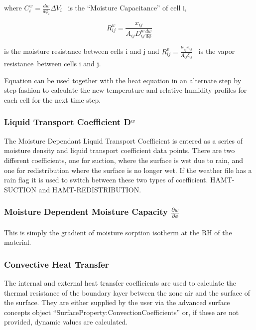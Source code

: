where \(C_i^w = \frac{dw}{d\phi_{i}}\Delta {V_i}\) ~is the ``Moisture Capacitance'' of cell i,

\begin{equation}
R_{ij}^w = \frac{{{x_{ij}}}}{{{A_{ij}}D_{ij}^w\frac{{dw}}{{d\phi }}}}
\end{equation}

is the moisture resistance between cells i and j and \(R_{ij}^v = \frac{\mu_{ij}x_{ij}}{A_{ij}\delta_{ij}}\) ~is the vapor resistance~between cells i and j.

Equation can be used together with the heat equation in an alternate step by step fashion to calculate the new temperature and relative humidity profiles for each cell for the next time step.

\subsubsection{\texorpdfstring{Liquid Transport Coefficient D\(^{w}\)}{Liquid Transport Coefficient D\^{}\{w\}}}\label{liquid-transport-coefficient-dw}

The Moisture Dependant Liquid Transport Coefficient is entered as a series of moisture density and liquid transport coefficient data points. There are two different coefficients, one for suction, where the surface is wet due to rain, and one for redistribution where the surface is no longer wet. If the weather file has a rain flag it is used to switch between these two types of coefficient. HAMT-SUCTION and HAMT-REDISTRIBUTION.

\subsubsection{\texorpdfstring{Moisture Dependent Moisture Capacity \(\frac{\partial w}{\partial \phi}\)}{Moisture Dependent Moisture Capacity \textbackslash{}frac\{\textbackslash{}partial w\}\{\textbackslash{}partial \textbackslash{}phi\}}}\label{moisture-dependent-moisture-capacity-fracpartial-wpartial-phi}

This is simply the gradient of moisture sorption isotherm at the RH of the material.

\subsubsection{Convective Heat Transfer}\label{convective-heat-transfer}

The internal and external heat transfer coefficients are used to calculate the thermal resistance of the boundary layer between the zone air and the surface of the surface. They are either supplied by the user via the advanced surface concepts object ``SurfaceProperty:ConvectionCoefficients'' or, if these are not provided, dynamic values are calculated.


